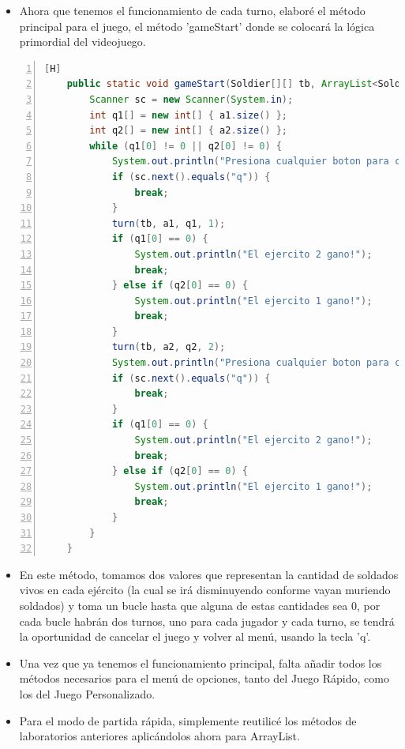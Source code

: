 \documentclass{article}
\begin{document}
	\begin{itemize}	
		\item Ahora que tenemos el funcionamiento de cada turno, elaboré el método principal para el juego, el método 'gameStart' donde se colocará la lógica primordial del videojuego.
	\end{itemize}
	\begin{lstlisting}[language=java,caption={Game Start}, numbers=left][H]
	public static void gameStart(Soldier[][] tb, ArrayList<Soldier> a1, ArrayList<Soldier> a2) {
        Scanner sc = new Scanner(System.in);
        int q1[] = new int[] { a1.size() };
        int q2[] = new int[] { a2.size() };
        while (q1[0] != 0 || q2[0] != 0) {
            System.out.println("Presiona cualquier boton para continuar: ");
            if (sc.next().equals("q")) {
                break;
            }
            turn(tb, a1, q1, 1);
            if (q1[0] == 0) {
                System.out.println("El ejercito 2 gano!");
                break;
            } else if (q2[0] == 0) {
                System.out.println("El ejercito 1 gano!");
                break;
            }
            turn(tb, a2, q2, 2);
            System.out.println("Presiona cualquier boton para continuar: ");
            if (sc.next().equals("q")) {
                break;
            }
            if (q1[0] == 0) {
                System.out.println("El ejercito 2 gano!");
                break;
            } else if (q2[0] == 0) {
                System.out.println("El ejercito 1 gano!");
                break;
            }
        }
    }
	\end{lstlisting}
	\begin{itemize}	
		\item En este método, tomamos dos valores que representan la cantidad de soldados vivos en cada ejército (la cual se irá disminuyendo conforme vayan muriendo soldados) y toma un bucle hasta que alguna de estas cantidades sea 0, por cada bucle habrán dos turnos, uno para cada jugador y cada turno, se tendrá la oportunidad de cancelar el juego y volver al menú, usando la tecla 'q'.
		\item Una vez que ya tenemos el funcionamiento principal, falta añadir todos los métodos necesarios para el menú de opciones, tanto del Juego Rápido, como los del Juego Personalizado.
		\item Para el modo de partida rápida, simplemente reutilicé los métodos de laboratorios anteriores aplicándolos ahora para ArrayList.
	\end{itemize}
\end{document}
